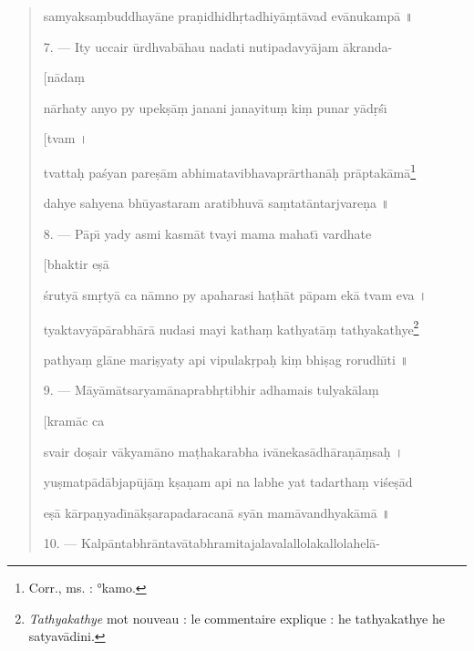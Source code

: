 \documentclass[a4paper, 11pt, oneside, french]{article}
\begin{document}
\begin{quotation}
samyaksa\d{m}buddhay\={a}ne pra\d{n}idhidh\d{r}tadhiy\={a}\d{m}t\={a}vad ev\={a}nukamp\={a} \texthindi{॥}

\bigskip

7. --- Ity uccair \={u}rdhvab\={a}hau nadati nutipadavy\={a}jam \={a}kranda-

\hspace*{85mm}[n\={a}da\d{m}

n\={a}rhaty anyo py upek\d{s}\={a}\d{m} janani janayitu\d{m} ki\d{m} punar y\={a}d\d{r}\'{s}\={\i}

\hspace*{85mm}[tvam \texthindi{।}

tvatta\d{h} pa\'{s}yan pare\d{s}\={a}m abhimatavibhavapr\={a}rthan\={a}\d{h} pr\={a}ptak\={a}m\={a}\footnote{Corr., ms. : °kamo.}

dahye sahyena bh\={u}yastaram aratibhuv\={a} sa\d{m}tat\={a}ntarjvare\d{n}a \texthindi{॥}

\bigskip

8. --- P\={a}p\={\i} yady asmi kasm\={a}t tvayi mama mahat\={\i} vardhate

\hspace*{85mm}[bhaktir e\d{s}\={a}

\'{s}ruty\={a} sm\d{r}ty\={a} ca n\={a}mno py apaharasi ha\d{t}h\={a}t p\={a}pam ek\={a} tvam eva \texthindi{।}

tyaktavy\={a}p\={a}rabh\={a}r\={a} nudasi mayi katha\d{m} kathyat\={a}\d{m} tathyakathye\footnote{\emph{Tathyakathye} mot nouveau : le commentaire explique : he tathyakathye he satyav\={a}dini.}

pathya\d{m} gl\={a}ne mari\d{s}yaty api vipulak\d{r}pa\d{h} ki\d{m} bhi\d{s}ag rorudh\={\i}ti \texthindi{॥}

\bigskip

9. --- M\={a}y\={a}m\={a}tsaryam\={a}naprabh\d{r}tibhir adhamais tulyak\={a}la\d{m}

\hspace*{85mm}[kram\={a}c ca

svair do\d{s}air v\={a}kyam\={a}no ma\d{t}hakarabha iv\={a}nekas\={a}dh\={a}ra\d{n}\={a}\d{m}sa\d{h} \texthindi{।}

yu\d{s}matp\={a}d\={a}bjap\={u}j\={a}\d{m} k\d{s}a\d{n}am api na labhe yat tadartha\d{m} vi\'{s}e\d{s}\={a}d

e\d{s}\={a} k\={a}rpa\d{n}yad\={\i}n\={a}k\d{s}arapadaracan\={a} sy\={a}n mam\={a}vandhyak\={a}m\={a} \texthindi{॥}

\bigskip

10. --- Kalp\={a}ntabhr\={a}ntav\={a}tabhramitajalavalallolakallolahel\={a}-


\end{quotation}
\end{document}
